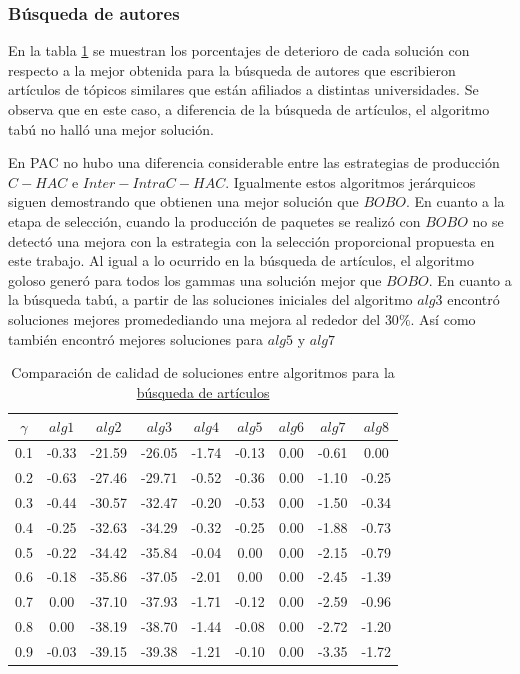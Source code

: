 \subsubsection{Búsqueda de autores}
En la tabla \ref{tabla:comp2} se muestran los porcentajes de deterioro de cada solución con respecto a la mejor obtenida para la búsqueda de autores que escribieron artículos de tópicos similares que están afiliados a distintas universidades. Se observa que en este caso, a diferencia de la búsqueda de artículos, el algoritmo tabú no halló una mejor solución.

En PAC no hubo una diferencia considerable entre las estrategias de producción $C-HAC$ e $Inter-Intra C-HAC$. Igualmente estos algoritmos jerárquicos siguen demostrando que obtienen una mejor solución que $BOBO$. En cuanto a la etapa de selección, cuando la producción de paquetes se realizó con $BOBO$ no se detectó una mejora con la estrategia con la selección proporcional propuesta en este trabajo. Al igual a lo ocurrido en la búsqueda de artículos, el algoritmo goloso generó para todos los gammas una solución mejor que $BOBO$. En cuanto a la búsqueda tabú, a partir de las soluciones iniciales del algoritmo $alg3$ encontró soluciones mejores promedediando una mejora al rededor del $30\%$. Así como también encontró mejores soluciones para $alg5$ y $alg7$

\begin{table}[H]
\begin{center}
\begin{tabular}{|c|c|c|c|c|c|c|c|c|}
\hline
$\gamma$&$alg1$&$alg2$&$alg3$&$alg4$&$alg5$&$alg6$&$alg7$&$alg8$ \\ \hline
0.1 & -0.33 & -21.59 & -26.05 & -1.74 & -0.13 & 0.00 & -0.61 & 0.00 \\
0.2 & -0.63 & -27.46 & -29.71 & -0.52 & -0.36 & 0.00 & -1.10 & -0.25 \\
0.3 & -0.44 & -30.57 & -32.47 & -0.20 & -0.53 & 0.00 & -1.50 & -0.34 \\
0.4 & -0.25 & -32.63 & -34.29 & -0.32 & -0.25 & 0.00 & -1.88 & -0.73 \\
0.5 & -0.22 & -34.42 & -35.84 & -0.04 & 0.00 & 0.00 & -2.15 & -0.79 \\
0.6 & -0.18 & -35.86 & -37.05 & -2.01 & 0.00 & 0.00 & -2.45 & -1.39 \\
0.7 & 0.00 & -37.10 & -37.93 & -1.71 & -0.12 & 0.00 & -2.59 & -0.96 \\ 
0.8 & 0.00 & -38.19 & -38.70 & -1.44 & -0.08 & 0.00 & -2.72 & -1.20 \\
0.9 & -0.03 & -39.15 & -39.38 & -1.21 & -0.10 & 0.00 & -3.35 & -1.72 \\ \hline 
\end{tabular}
\caption{Comparación de calidad de soluciones entre algoritmos para la \hyperref[busqueda:autores]{búsqueda de artículos}} 
\label{tabla:comp2}
\end{center}
\end{table}

